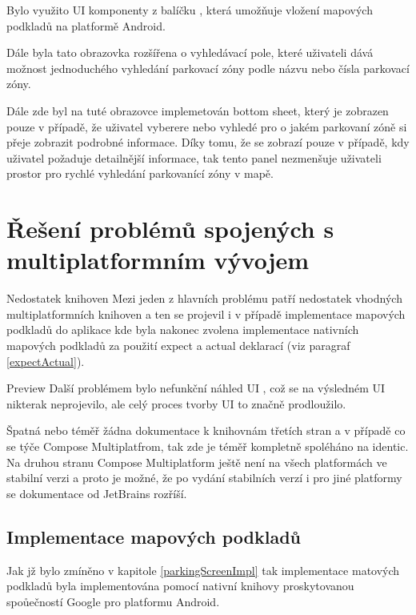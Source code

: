 Bylo využito UI komponenty  z balíčku , která umožňuje vložení mapových podkladů 
na platformě Android.

Dále byla tato obrazovka rozšířena o vyhledávací pole, které uživateli dává možnost jednoduchého vyhledání parkovací zóny podle názvu nebo čísla 
parkovací zóny.



Dále zde byl na tuté obrazovce implemetován bottom sheet, který je zobrazen pouze v případě, že uživatel vyberere nebo vyhledé pro o jakém 
parkovaní zóně si přeje zobrazit podrobné informace. Díky tomu, že se zobrazí pouze v případě, kdy uživatel požaduje detailnější informace, tak
tento panel nezmenšuje uživateli prostor pro rychlé vyhledání parkovanící zóny v mapě.



\section{Řešení problémů spojených s multiplatformním vývojem}
Nedostatek knihoven
Mezi jeden z hlavních problému patří nedostatek vhodných multiplatformních knihoven a ten se projevil i v případě implementace mapových podkladů
do aplikace kde byla nakonec zvolena implementace nativních mapových podkladů za použití expect a actual deklarací (viz paragraf \ref{expectActual}).

Preview
Další problémem bylo nefunkční náhled UI , což se na výsledném UI nikterak neprojevilo, ale celý proces tvorby UI to značně prodloužilo.

Špatná nebo téměř žádna dokumentace k knihovnám třetích stran a v případě co se týče Compose Multiplatfrom, tak zde je téměř kompletně spoléháno na
identic. 
Na druhou stranu Compose Multiplatform ještě není na všech platformách ve stabilní verzi a proto je možné, že po vydání stabilních verzí i pro jiné
platformy se dokumentace od JetBrains rozříší.


\subsection{Implementace mapových podkladů}

Jak jž bylo zmíněno v kapitole \ref{parkingScreenImpl} tak implementace matových podkladů byla implementována pomocí nativní knihovy proskytovanou
spoůečností Google pro platformu Android. 

